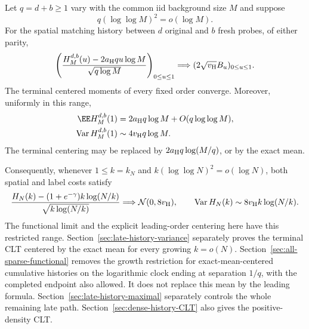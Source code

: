 \documentclass[11pt,letterpaper]{article}
\begin{document}
\begin{theorem}
\label{thm:slow-edit-history-CLT}
Let $q=d+b\ge1$ vary with the common iid background size $M$ and
suppose
\begin{equation}\label{eq:slow-edit-range}
 q(\log\log M)^2=o(\log M).
\end{equation}
For the spatial matching history between $d$ original and $b$
fresh probes, of either parity,
\begin{equation}\label{eq:slow-edit-history-FCLT}
 \left(\frac{H_M^{d,b}(u)-2a_{\rm H}q u\log M}
                     {\sqrt{q\log M}}\right)_{0\le u\le1}
       \Longrightarrow (2\sqrt{v_{\rm H}}B_u)_{0\le u\le1}.
\end{equation}
The terminal centered moments of every fixed order converge.
Moreover, uniformly in this range,
\begin{align}
 \EE H_M^{d,b}(1)&=2a_{\rm H}q\log M+O(q\log\log M),
                                      \label{eq:slow-edit-mean}\\
 \operatorname{Var}H_M^{d,b}(1)&\sim4v_{\rm H}q\log M.
                                      \label{eq:slow-edit-variance}
\end{align}
The terminal centering may be replaced by
$2a_{\rm H}q\log(M/q)$, or by the exact mean.

Consequently, whenever $1\le k=k_N$ and
$k(\log\log N)^2=o(\log N)$, both spatial and label costs satisfy
\begin{equation}\label{eq:slow-resampling-CLT}
 \frac{H_N(k)-(1+e^{-\gamma})k\log(N/k)}
                      {\sqrt{k\log(N/k)}}
       \Longrightarrow\mathcal N(0,8v_{\rm H}),
 \qquad \operatorname{Var}H_N(k)\sim8v_{\rm H}k\log(N/k).
\end{equation}
The functional limit and the explicit leading-order centering here
have this restricted range. Section~\ref{sec:late-history-variance}
separately proves the terminal CLT centered by the exact mean for
every growing $k=o(N)$.
Section~\ref{sec:all-sparse-functional} removes the growth restriction
for exact-mean-centered cumulative histories on the logarithmic
clock ending at separation $1/q$, with the completed endpoint
also allowed. It does not replace this mean by the leading formula.
Section~\ref{sec:late-history-maximal} separately controls the
whole remaining late path.
Section~\ref{sec:dense-history-CLT} also gives the positive-density CLT.
\end{theorem}
\end{document}
